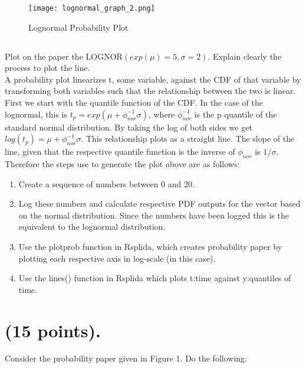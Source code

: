 \documentclass{article}
\begin{document}
\begin{figure}
  \centering
  \texttt{[image: lognormal\_graph\_2.png]}
  \caption{Lognormal Probability Plot}
\end{figure}
\FloatBarrier

\subsection{}
Plot on the paper the LOGNOR\begin{math}(exp(\mu) = 5, \sigma = 2).\end{math}
Explain clearly the process to plot the line.\\

A probability plot linearizes t, some variable, against the CDF of that variable by transforming both variables such that the relationship between the two is linear.  First we start with the quantile function of the CDF.  In the case of the lognormal, this is \(t_p = exp(\mu + \phi_{nor}^{-1} \sigma)\), where \(\phi_{nor}^{-1}\) is the p quantile of the standard normal distribution.  By taking the log of both sides we get \(log(t_p) = \mu + \phi_{nor}^{-1} \sigma\).  This relationship plots as a straight line.  The slope of the line, given that the respective quantile function is the inverse of  \(\phi_{nor}\) is \(1/\sigma\).\\

Therefore the steps use to generate the plot above are as follows:\\
\begin{enumerate}
\item Create a sequence of numbers between 0 and 20.\\

\item Log these numbers and calculate respective PDF outputs for the vector based on the normal distribution.  Since the numbers have been logged this is the equivalent to the lognormal distribution.

\item Use the plotprob function in Rsplida, which creates probability paper by plotting each respective axis in log-scale (in this case).

\item Use the lines() function in Rsplida which plots t:time against y:quantiles of time.
\end{enumerate}
\newpage


\section{(15 points).}
Consider the probability paper given in Figure 1. Do the following:\\
\end{document}
